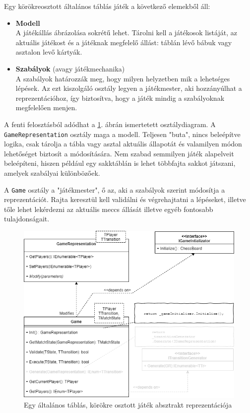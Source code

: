 \documentclass[twoside, a4paper, 12pt]{article}
\begin{document}
Egy körökreosztott általános táblás játék a következő elemekből áll:

\begin{itemize}
	\item \textbf{Modell} \\
	A játékállás ábrázolása sokrétű lehet. Tárolni kell a játékosok listáját, az aktuális játékost és a játéknak megfelelő állást: táblán lévő bábuk vagy asztalon levő kártyák.
	
	\item \textbf{Szabályok} (avagy játékmechanika) \\
	A szabályok határozzák meg, hogy milyen helyzetben mik a lehetséges lépések. Az ezt kiszolgáló osztály legyen a játékmester, aki hozzányúlhat a reprezentációhoz, így biztosítva, hogy a játék mindig a szabályoknak megfelelően menjen.
\end{itemize}

A fenti felosztásból adódhat a \ref{fig:boardGameAbstractClassDiagram}. ábrán ismertetett osztálydiagram. A \texttt{GameRepresentation} osztály maga a modell. Teljesen "buta", nincs beleépítve logika, csak tárolja a tábla vagy asztal aktuális állapotát és valamilyen módon lehetőséget biztosít a módosítására. Nem szabad semmilyen játék alapelveit beleépíteni, hiszen például egy sakktáblán is lehet többfajta sakkot játszani, amelyek szabályai különbözőek.

A \texttt{Game} osztály a "játékmester", ő az, aki a szabályok szerint módosítja a reprezentációt. Rajta keresztül kell validálni és végrehajtatni a lépéseket, illetve tőle lehet lekérdezni az aktuális meccs állását illetve egyéb fontosabb tulajdonságait.

\begin{figure}[htbp]
	\centering
	\includegraphics[width=\textwidth]{img/boardGameAbstractClassDiagram.png}
	\caption{Egy általános táblás, körökre osztott játék absztrakt reprezentációja}
	\label{fig:boardGameAbstractClassDiagram}
\end{figure}
\end{document}
